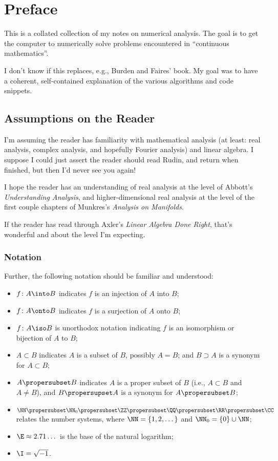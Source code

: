 \chapter{Preface}

This is a collated collection of my notes on numerical analysis.
The goal is to get the computer to numerically solve problems
encountered in ``continuous mathematics''.

I don't know if this replaces, e.g., Burden and Faires' book. My goal
was to have a coherent, self-contained explanation of the various
algorithms and code snippets.

\section*{Assumptions on the Reader}

I'm assuming the reader has familiarity with mathematical analysis (at
least: real analysis, complex analysis, and hopefully Fourier analysis)
and linear algebra. I suppose I could just assert the reader should read
Rudin, and return when finished, but then I'd never see you again!

I hope the reader has an understanding of real analysis at the level of
Abbott's \emph{Understanding Analysis}, and higher-dimensional real
analysis at the level of the first couple chapters of Munkres's
\emph{Analysis on Manifolds}.

If the reader has read through Axler's \emph{Linear Algebra Done Right},
that's wonderful and about the level I'm expecting.

\subsection*{Notation}

Further, the following notation should be familiar and understood:

\begin{itemize}
\item $f\colon A\into B$ indicates $f$ is an injection of $A$ into $B$;
\item $f\colon A\onto B$ indicates $f$ is a surjection of $A$ onto $B$;
\item $f\colon A\iso B$ is unorthodox notation indicating $f$ is an
  isomorphism or bijection of $A$ to $B$;
\item $A\subset B$ indicates $A$ is a subset of $B$, possibly $A=B$;
  and $B\supset A$ is a synonym for $A\subset B$;
\item $A\propersubset B$ indicates $A$ is a proper subset of $B$ (i.e.,
  $A\subset B$ and $A\neq B$), and $B\propersupset A$ is a synonym for
  $A\propersubset B$;
\item $\NN\propersubset\NN_{0}\propersubset\ZZ\propersubset\QQ\propersubset\RR\propersubset\CC$
  relates the number systems, where $\NN = \{1,2,\dots\}$ and $\NN_{0}=\{0\}\cup\NN$;
\item $\E\approx 2.71\dots$ is the base of the natural logarithm;
\item $\I=\sqrt{-1}$.
\end{itemize}

